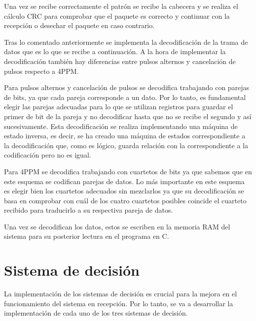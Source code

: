 Una vez se recibe correctamente el patrón se recibe la cabecera y se realiza el 
cálculo CRC para comprobar que el paquete es correcto y continuar con la recepción o 
desechar el paquete en caso contrario.

Tras lo comentado anteriormente se implementa la decodificación de la trama de datos
que es lo que se recibe a continuación. A la hora de implementar la decodificación
también hay diferencias entre pulsos alternos y cancelación de pulsos respecto a 4PPM. 

Para pulsos alternos y cancelación de pulsos se decodifica trabajando con parejas de 
bits, ya que cada pareja corresponde a un dato. Por lo tanto, es fundamental elegir las 
parejas adecuadas para lo que se utilizan registros para guardar el primer de bit de la 
pareja y no decodificar hasta que no se recibe el segundo y así sucesivamente. Esta 
decodificación se realiza implementando una máquina de estado inversa, es decir, se ha 
creado una máquina de estados correspondiente a la decodificación que, como es lógico, 
guarda relación con la correspondiente a la codificación pero no es igual.

Para 4PPM se decodifica trabajando con cuartetos de bits ya que sabemos que en este 
esquema se codifican parejas de datos. Lo más importante en este esquema es elegir
bien los cuartetos adecuados sin mezclarlos ya que su decodificación se basa en 
comprobar con cuál de los cuatro cuartetos posibles coincide el cuarteto recibido para 
traducirlo a su respectiva pareja de datos.

Una vez se decodifican los datos, estos se escriben en la memoria RAM del sistema para 
su posterior lectura en el programa en C.



\section{Sistema de decisión}

La implementación de los sistemas de decisión es crucial para la mejora en el 
funcionamiento del sistema en recepción. Por lo tanto, se va a desarrollar la 
implementación de cada uno de los tres sistemas de decisión.

